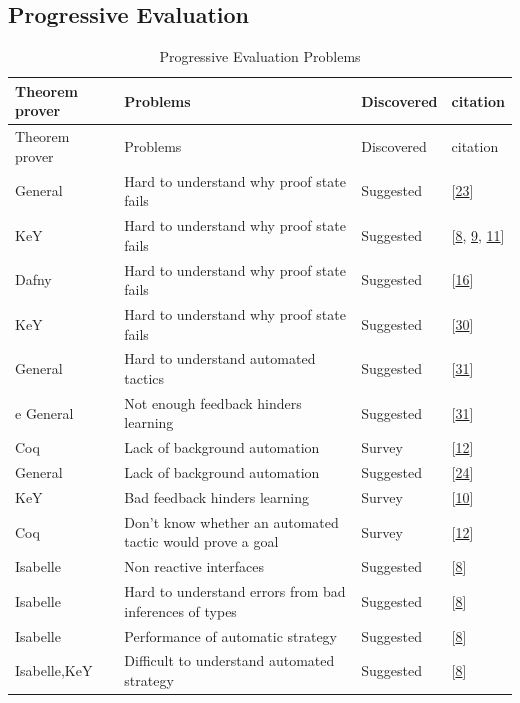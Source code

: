 \documentclass[
]{article}
\begin{document}
\hypertarget{progressive-evaluation-1}{%
\subsection{Progressive Evaluation}\label{progressive-evaluation-1}}

\hypertarget{tbl:progressive_evaluation}{}
\begin{longtable}[]{@{}llll@{}}
\caption{\label{tbl:progressive_evaluation}Progressive Evaluation
Problems}\tabularnewline
\toprule
Theorem prover & Problems & Discovered & citation \\
\midrule
\endfirsthead
\toprule
Theorem prover & Problems & Discovered & citation \\
\midrule
\endhead
General & Hard to understand why proof state fails & Suggested &
{[}\protect\hyperlink{ref-hentschel_interactive_2016}{23}{]} \\
KeY & Hard to understand why proof state fails & Suggested &
{[}\protect\hyperlink{ref-beckert_usability_2015}{8},
\protect\hyperlink{ref-beckert_interaction_2017}{9},
\protect\hyperlink{ref-beckert_interactive_2015}{11}{]} \\
Dafny & Hard to understand why proof state fails & Suggested &
{[}\protect\hyperlink{ref-grebing_seamless_2020}{16}{]} \\
KeY & Hard to understand why proof state fails & Suggested &
{[}\protect\hyperlink{ref-lin_understanding_2016}{30}{]} \\
General & Hard to understand automated tactics & Suggested &
{[}\protect\hyperlink{ref-mitsch_keymaera_2017}{31}{]} \\
e General & Not enough feedback hinders learning & Suggested &
{[}\protect\hyperlink{ref-mitsch_keymaera_2017}{31}{]} \\
Coq & Lack of background automation & Survey &
{[}\protect\hyperlink{ref-berman_development_2014}{12}{]} \\
General & Lack of background automation & Suggested &
{[}\protect\hyperlink{ref-hunter_agent-based_2005}{24}{]} \\
KeY & Bad feedback hinders learning & Survey &
{[}\protect\hyperlink{ref-beckert_evaluating_2012}{10}{]} \\
Coq & Don't know whether an automated tactic would prove a goal & Survey
& {[}\protect\hyperlink{ref-berman_development_2014}{12}{]} \\
Isabelle & Non reactive interfaces & Suggested &
{[}\protect\hyperlink{ref-beckert_usability_2015}{8}{]} \\
Isabelle & Hard to understand errors from bad inferences of types &
Suggested & {[}\protect\hyperlink{ref-beckert_usability_2015}{8}{]} \\
Isabelle & Performance of automatic strategy & Suggested &
{[}\protect\hyperlink{ref-beckert_usability_2015}{8}{]} \\
Isabelle,KeY & Difficult to understand automated strategy & Suggested &
{[}\protect\hyperlink{ref-beckert_usability_2015}{8}{]} \\
\bottomrule
\end{longtable}
\end{document}
